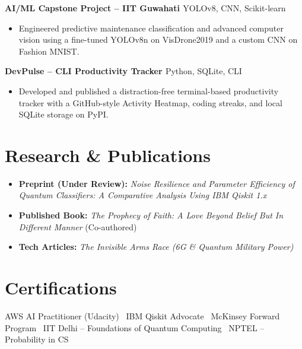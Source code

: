 \documentclass[9.5pt,letterpaper]{article}
\newenvironment{resumeItemize}{
  \begin{itemize}[leftmargin=0.14in, itemsep=0pt, parsep=0pt, topsep=1pt, partopsep=0pt, label=\textbullet]
}{\end{itemize}}
\newcommand{\resumeItem}[1]{\item \small #1}
\newcommand{\resumeHeading}[2]{
  \noindent\textbf{\small #1} \hfill \small #2 \\[0pt]
}
\begin{document}
\resumeHeading{AI/ML Capstone Project -- IIT Guwahati \; \href{https://drive.google.com/drive/u/1/folders/1zGVdV4yGSP7T_nODbi_nbBGst107jPBY}{\faLink}}{YOLOv8, CNN, Scikit-learn}
\begin{resumeItemize}
  \resumeItem{Engineered predictive maintenance classification and advanced computer vision using a fine-tuned YOLOv8n on VisDrone2019 and a custom CNN on Fashion MNIST.}
\end{resumeItemize}

\resumeHeading{DevPulse -- CLI Productivity Tracker \; \href{https://pypi.org/project/raj-devpulse-cli/}{\faLink}}{Python, SQLite, CLI}
\begin{resumeItemize}
  \resumeItem{Developed and published a distraction-free terminal-based productivity tracker with a GitHub-style Activity Heatmap, coding streaks, and local SQLite storage on PyPI.}
\end{resumeItemize}

\section*{Research \& Publications}
\begin{resumeItemize}
  \resumeItem{\textbf{Preprint (Under Review):} \textit{Noise Resilience and Parameter Efficiency of Quantum Classifiers: A Comparative Analysis Using IBM Qiskit 1.x}}
  \resumeItem{\textbf{Published Book:} \textit{The Prophecy of Faith: A Love Beyond Belief But In Different Manner} \href{https://www.amazon.in/dp/B0HBYX9X5T}{\faAmazon} (Co-authored)}
  \resumeItem{\textbf{Tech Articles:} \textit{The Invisible Arms Race (6G \& Quantum Military Power)} \href{https://medium.com/@rajnisihsingh}{\faMedium}}
\end{resumeItemize}

\section*{Certifications}
\small AWS AI Practitioner (Udacity) \textbullet\ IBM Qiskit Advocate \textbullet\ McKinsey Forward Program \textbullet\ IIT Delhi -- Foundations of Quantum Computing \textbullet\ NPTEL -- Probability in CS
\end{document}

